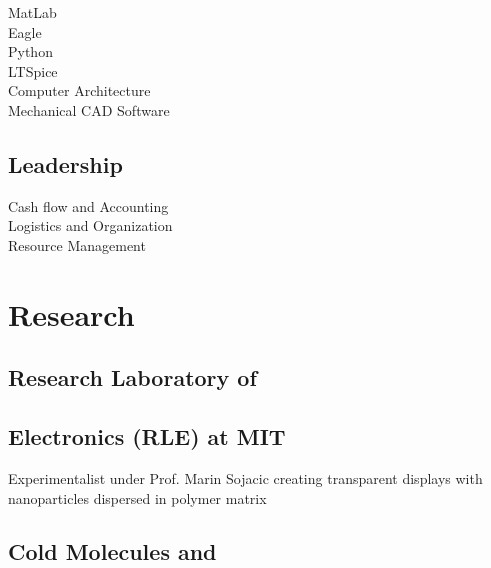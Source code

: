 \documentclass[letterpaper, article]{deedy-resume-openfont}
\begin{document}
\begin{minipage}[t]{0.33\textwidth}
MatLab \hspace{3.28cm} \textbullet \textbullet \textbullet \textbullet  \textbullet\\
Eagle \hspace{3.63cm} \textbullet \textbullet \textbullet \textbullet  \textbullet \\
Python \hspace{3.37cm} \textbullet \textbullet \textbullet  \textbullet \\
LTSpice \hspace{3.31cm} \textbullet \textbullet \textbullet \textbullet   \\
Computer Architecture \hspace{.95cm} \textbullet \textbullet  \textbullet \\
Mechanical CAD Software \hspace{.5cm} \textbullet \textbullet  \textbullet \\




\sectionsep

\subsection{Leadership}
Cash flow and Accounting \hspace{.55cm} \textbullet \textbullet \textbullet  \textbullet\\
Logistics and Organization \hspace{.5cm} \textbullet \textbullet  \textbullet \\
Resource Management \hspace{.98cm} \textbullet \textbullet \textbullet \textbullet  \textbullet


\section{Research}

\subsection{Research Laboratory of \hfill}
\subsection{Electronics (RLE) at MIT \hfill}
Experimentalist under Prof. Marin Sojacic creating transparent displays with nanoparticles dispersed in polymer matrix
\sectionsep
\subsection{Cold Molecules and \hfill}

\end{minipage}
\end{document}
